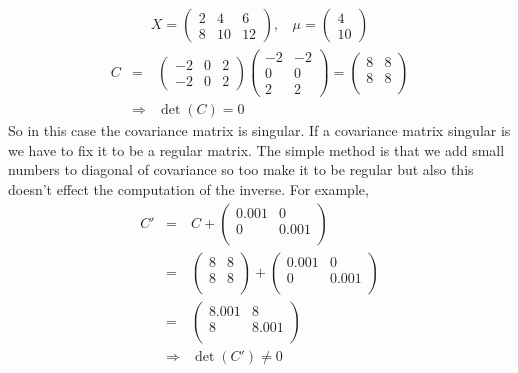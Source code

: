 \documentclass[a4paper,11pt]{article}
\begin{document}
\begin{eqnarray*}
X=
\left(
\begin{array}{cccc}
2 & 4 & 6 \\
8 & 10 & 12  
\end{array}
\right)
, \:\:\:\:
\mu = 
\left(
\begin{array}{cccc}
4  \\
10  
\end{array}
\right) 
\end{eqnarray*}
\begin{eqnarray*}
C &=&
\left(
\begin{array}{cccc}
-2 & 0 & 2 \\
-2 & 0 & 2  
\end{array}
\right) 
\left(
\begin{array}{cccc}
-2 & -2\\
0 & 0 \\
2 & 2  
\end{array}
\right) 
= 
\left(
\begin{array}{cccc}
8 & 8\\
8 & 8 \\  
\end{array}
\right) \\
&\Rightarrow& \det(C) =0
\end{eqnarray*}
So in this case the covariance matrix is singular. If a covariance matrix singular is we have to fix it to be a regular matrix. The simple method is that we add small numbers to diagonal of covariance so too make it to be regular but also this doesn't effect the computation of the inverse. For example,
\begin{eqnarray*}
C' &=& C +
\left(
\begin{array}{cccc}
0.001 & 0\\
0 & 0.001 \\  
\end{array}
\right) \\
&=&
\left(
\begin{array}{cccc}
8 & 8\\
8 & 8 \\  
\end{array}
\right) 
+
\left(
\begin{array}{cccc}
0.001 & 0\\
0 & 0.001 \\  
\end{array}
\right) \\
&=&
\left(
\begin{array}{cccc}
8.001 & 8\\
8 & 8.001 \\  
\end{array}
\right) \\
&\Rightarrow & \det(C') \neq 0
\end{eqnarray*}
\end{document}
